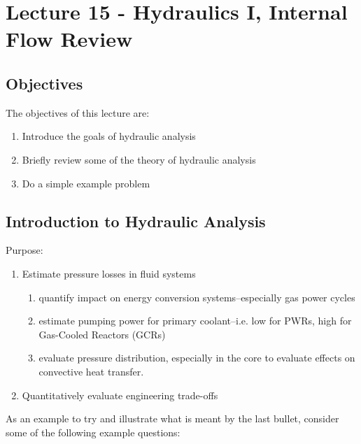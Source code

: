 \chapter{Lecture 15 - Hydraulics I, Internal Flow Review}
\label{ch:ch15}
\section{Objectives}
The objectives of this lecture are:
\begin{enumerate}
\item Introduce the goals of hydraulic analysis
\item Briefly review some of the theory of hydraulic analysis
\item Do a simple example problem
\end{enumerate}

\section{Introduction to Hydraulic Analysis}

Purpose:
\begin{enumerate}
\item Estimate pressure losses in fluid systems
\begin{enumerate}
\item quantify impact on energy conversion systems--especially gas power cycles
\item estimate pumping power for primary coolant--i.e. low for PWRs, high for Gas-Cooled Reactors (GCRs)
\item evaluate pressure distribution, especially in the core to evaluate effects on convective heat transfer.
\end{enumerate}
\item Quantitatively evaluate engineering trade-offs
\end{enumerate}

As an example to try and illustrate what is meant by the last bullet, consider some of the following example questions:

